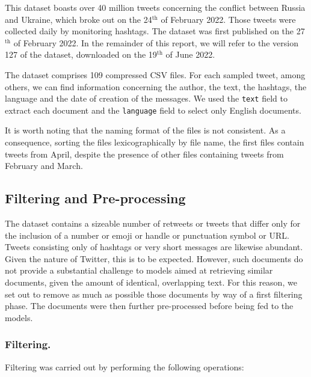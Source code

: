 \documentclass[runningheads]{llncs}
\begin{document}
This dataset boasts over 40 million tweets concerning the conflict between Russia and Ukraine, which broke out on the 24$^{\text{th}}$ of February 2022. Those tweets were collected daily by monitoring hashtags. The dataset was first published on the 27$^{\text{th}}$ of February 2022. In the remainder of this report, we will refer to the version 127 of the dataset, downloaded on the 19$^{\text{th}}$ of June 2022. 

The dataset comprises 109 compressed CSV files. For each sampled tweet, among others, we can find information concerning the author, the text, the hashtags, the language and the date of creation of the messages. We used the \texttt{text} field to extract each document and the \texttt{language} field to select only English documents. 

It is worth noting that the naming format of the files is not consistent. As a consequence, sorting the files lexicographically by file name, the first files contain tweets from April, despite the presence of other files containing tweets from February and March.

\subsection{Filtering and Pre-processing}
\label{subsec:dataset:preprocessing}

The dataset contains a sizeable number of retweets or tweets that differ only for the inclusion of a number or emoji or handle or punctuation symbol or URL. Tweets consisting only of hashtags or very short messages are likewise abundant. Given the nature of Twitter, this is to be expected. However, such documents do not provide a substantial challenge to models aimed at retrieving similar documents, given the amount of identical, overlapping text. For this reason, we set out to remove as much as possible those documents by way of a first filtering phase. The documents were then further pre-processed before being fed to the models.

\subsubsection{Filtering.} Filtering was carried out by performing the following operations: 
\end{document}
